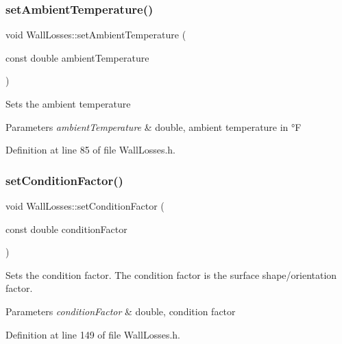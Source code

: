 \subsubsection{\texorpdfstring{set\+Ambient\+Temperature()}{setAmbientTemperature()}\hspace{0.1cm}{\footnotesize\ttfamily [3/3]}}
{\footnotesize\ttfamily void Wall\+Losses\+::set\+Ambient\+Temperature (\begin{DoxyParamCaption}\item[{const double}]{ambient\+Temperature }\end{DoxyParamCaption})\hspace{0.3cm}{\ttfamily [inline]}}

Sets the ambient temperature 
\begin{DoxyParams}{Parameters}
{\em ambient\+Temperature} & double, ambient temperature in °F \\
\hline
\end{DoxyParams}


Definition at line 85 of file Wall\+Losses.\+h.

\mbox{\label{class_wall_losses_a1533a7513460d22f433fb670700573a2}} 
\subsubsection{\texorpdfstring{set\+Condition\+Factor()}{setConditionFactor()}\hspace{0.1cm}{\footnotesize\ttfamily [1/3]}}
{\footnotesize\ttfamily void Wall\+Losses\+::set\+Condition\+Factor (\begin{DoxyParamCaption}\item[{const double}]{condition\+Factor }\end{DoxyParamCaption})\hspace{0.3cm}{\ttfamily [inline]}}

Sets the condition factor. The condition factor is the surface shape/orientation factor. 
\begin{DoxyParams}{Parameters}
{\em condition\+Factor} & double, condition factor \\
\hline
\end{DoxyParams}


Definition at line 149 of file Wall\+Losses.\+h.

